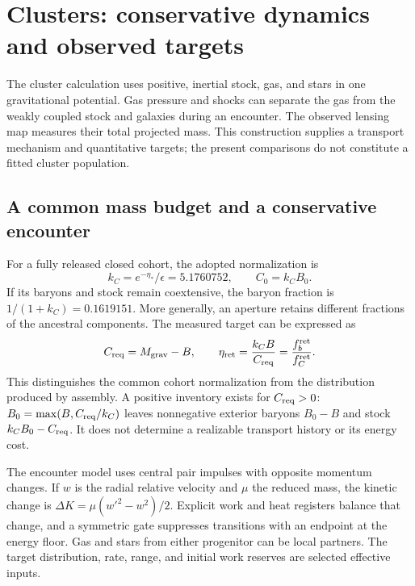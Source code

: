 \section{Clusters: conservative dynamics and observed targets}
\label{sec:clusters}

The cluster calculation uses positive, inertial stock, gas, and stars in
one gravitational potential. Gas pressure and shocks can separate the
gas from the weakly coupled stock and galaxies during an encounter.
The observed lensing map measures their total projected mass. This
construction supplies a transport mechanism and quantitative targets;
the present comparisons do not constitute a fitted cluster population.

\subsection{A common mass budget and a conservative encounter}
For a fully released closed cohort, the adopted normalization is
\begin{equation}
k_C=e^{-\eta_*}/\epsilon=5.1760752,\qquad C_0=k_C B_0.
\end{equation}
If its baryons and stock remain coextensive, the baryon fraction is
$1/(1+k_C)=0.1619151$. More generally, an aperture retains different
fractions of the ancestral components. The measured target can be
expressed as
\begin{equation}
C_{\rm req}=M_{\rm grav}-B,\qquad
\eta_{\rm ret}=\frac{k_C B}{C_{\rm req}}
=\frac{f_b^{\rm ret}}{f_C^{\rm ret}}.
\end{equation}
This distinguishes the common cohort normalization from the distribution
produced by assembly. A positive inventory exists for $C_{\rm req}>0$:
$B_0=\max(B,C_{\rm req}/k_C)$ leaves nonnegative exterior baryons
$B_0-B$ and stock $k_CB_0-C_{\rm req}$. It does not determine a
realizable transport history or its energy cost.

The encounter model uses central pair impulses with opposite momentum
changes. If $w$ is the radial relative velocity and $\mu$ the reduced
mass, the kinetic change is $\Delta K=\mu(w'^2-w^2)/2$. Explicit work
and heat registers balance that change, and a symmetric gate suppresses
transitions with an endpoint at the energy floor. Gas and stars from
either progenitor can be local partners. The target distribution, rate,
range, and initial work reserves are selected effective inputs.

